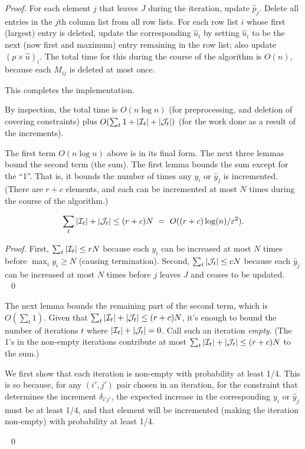 \documentclass[11pt]{svjour3} \usepackage{fullpage}
\newcommand{\primalOf}[1]{{{#1}}}
\newcommand{\dualOf}[1]{{\hat{#1}}}
\newcommand{\MM}{M}
\newcommand{\JJ}{J}
\newcommand{\yp}{\primalOf y}
\newcommand{\pp}{\primalOf p}
\newcommand{\Ip}{\calI}
\newcommand{\yd}{\dualOf y}
\newcommand{\pd}{\dualOf p}
\newcommand{\wwd}{\dualOf u}
\newcommand{\Jd}{\calJ}
\newenvironment{Proof}{\begin{proof}}{{} ~\hfill\hfill\qed~\end{proof}}
\newcommand{\eps}{\varepsilon}
\newcommand{\calI}{{\cal I}}
\newcommand{\calJ}{{\cal J}}
\newcommand{\rows}{r}
\newcommand{\columns}{c}
\newcommand{\inputsize}{n}
\begin{document}
\begin{Proof}
For each element $j$ that leaves $\JJ$ during the iteration, update $\pd_j$.
Delete all entries in the $j$th column list from all row lists.
For each row list $i$ whose first (largest) entry is deleted, 
update the corresponding $\wwd_{i}$ 
by setting $\wwd_{i}$ to be the next (now first and maximum) entry
remaining in the row list;
also update $(\pp\times\wwd)_i$.
The total time for this during the course of the algorithm is
$O(\inputsize )$, because each $\MM_{ij}$ is deleted at most once.

This completes the implementation.

By inspection, the total time is
$O(\inputsize\log \inputsize)$ (for preprocessing, and deletion of covering constraints)
plus $O(\sum_t1+|\Ip_t|+|\Jd_t|)$ (for the work done as a result of the increments).

The first term $O(n\log n)$ above is in its final form.
The next three lemmas bound the second term (the sum).
The first lemma bounds the sum except for the ``1''.
That is, it bounds the number of times any $\yp_i$ or $\yd_j$ is incremented.
(There are $r+c$ elements, and each can be incremented at most $N$ times
during the course of the algorithm.)

\begin{lemma}\label{lemma:totaltime}
\[\sum_t |\Ip_t|+|\Jd_t| \le (\rows+\columns) N 
~=~
O((\rows+\columns)\log(\inputsize)/\eps^2).\]
\end{lemma}
\begin{Proof}
First, $\sum_t |\Ip_t| \le \rows N$ 
because each $\yp_{i}$ 
can be increased at most $N$ times 
before $\max_i\yp_i \ge N$ (causing termination).
Second, $\sum_t |\Jd_t| \le \columns N$ 
because each $\yd_{j}$ 
can be increased at most $N$ times 
before $j$ leaves $\JJ$ and ceases to be updated.
\end{Proof}

The next lemma bounds the remaining part of the second term,
which is $O(\sum_t1)$.
Given that $\sum_t|\Ip_t|+|\Jd_t| \le (\rows+\columns)N$,
it's enough to bound the number of iterations $t$
where $|\Ip_t|+|\Jd_t|=0$.
Call such an iteration {\em empty}.
(The 1's in the non-empty iterations contribute 
at most $\sum_t |\Ip_t|+|\Jd_t| \le (\rows+\columns)N$ to the sum.)


We first show that each iteration is non-empty with probability at least 1/4.
This is so because, for any $(i',j')$ pair chosen in an iteration,
for the constraint that determines the increment $\delta_{i'j'}$,
the expected increase in the corresponding $\yp_i$ or $\yd_j$ 
must be at least 1/4, and that element will be incremented
(making the iteration non-empty)
with probability at least 1/4.


\end{Proof}
\end{document}
